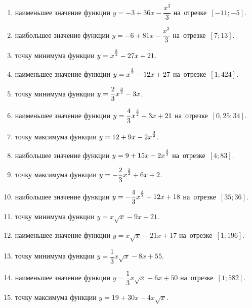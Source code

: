 \documentclass[a4paper,10pt]{article}
\begin{document}
\begin{enumerate}
\item {} наименьшее значение функции $y=-3 +36x-\dfrac{x^3}{3}$ на~отрезке~$\left[-11;-5\right]$.

\item {} наибольшее значение функции $y=-6 +81x-\dfrac{x^3}{3}$ на~отрезке~$\left[7;13\right]$.

\item {} точку минимума функции $y=x\strut^{\frac{3}{2}} -27x+21$.

\item {} наименьшее значение функции $y=x\strut^{\frac{3}{2}} -12x+27$ на~отрезке~$\left[1;424\right]$.

\item {} точку минимума функции $y=\dfrac{2}{3}x\strut^{\frac{3}{2}} -3x$.

\item {} наименьшее значение функции $y=\dfrac{4}{3}x\strut^{\frac{3}{2}} -3x+21$ на~отрезке~$\left[0,25;34\right]$.

\item {} точку максимума функции $y=12+9x-2x\strut^{\frac{3}{2}}$.

\item {} наибольшее значение функции $y=9+15x-2x\strut^{\frac{3}{2}}$ на~отрезке~$\left[4;83\right]$.

\item {} точку максимума функции $y=-\dfrac{2}{3}x\strut^{\frac{3}{2}} +6x+2$.

\item {} наибольшее значение функции $y=-\dfrac{4}{3}x\strut^{\frac{3}{2}} +12x+18$ на~отрезке~$\left[35;36\right]$.

\item {} точку минимума функции $y=x\sqrt{x} -9x+21$.

\item {} наименьшее значение функции $y=x\sqrt{x} -21x+17$ на~отрезке~$\left[1;196\right]$.

\item {} точку минимума функции $y=\dfrac{1}{3}x\sqrt{x} -8x+55$.

\item {} наименьшее значение функции $y=\dfrac{1}{3}x\sqrt{x} -6x+50$ на~отрезке~$\left[1;582\right]$.

\item {} точку максимума функции $y=19+30x -4x\sqrt{x}$.


\end{enumerate}
\end{document}
